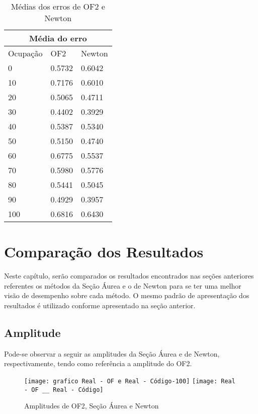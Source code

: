 \begin{table}[htb]
\centering
\ABNTEXfontereduzida
\caption[Médias dos erros de OF2 e Newton]{Médias dos erros de OF2 e Newton}
\label{media-dos-erro-newton}
\begin{tabular}{ |p{3cm}|p{3cm}|p{3cm}|  }
\hline
\multicolumn{3}{|c|}{Média do erro} \\
\hline
Ocupação & OF2 & Newton\\
\hline
 0 & 0.5732 & 0.6042\\
 10 & 0.7176 & 0.6010\\
 20 & 0.5065 & 0.4711\\
 30 & 0.4402 & 0.3929\\
 40 & 0.5387 & 0.5340\\
 50 & 0.5150 & 0.4740\\
 60 & 0.6775 & 0.5537\\
 70 & 0.5980 & 0.5776\\
 80 & 0.5441 & 0.5045\\
 90 & 0.4929 & 0.3957\\
 100 & 0.6816 & 0.6430\\
\hline
\end{tabular}
\end{table}

\newline
\newline

\section{Comparação dos Resultados}
\label{Comparação}

Neste capítulo, serão comparados os resultados encontrados nas seções anteriores referentes os métodos da Seção Áurea e o de Newton para se ter uma melhor visão de desempenho sobre cada método. O mesmo padrão de apresentação dos resultados é utilizado conforme apresentado na seção anterior. 

\subsection{Amplitude}
Pode-se observar a seguir as amplitudes da Seção Áurea e de Newton, respectivamente, tendo como referência a amplitude do OF2.

\begin{figure}[H]
    \centering
    \caption{Amplitudes de OF2, Seção Áurea e Newton}
    \texttt{[image: grafico Real - OF e Real - Código-100]}
    \texttt{[image: Real - OF \_\_ Real - Código]}
    \label{modeloNfce}
\end{figure}

